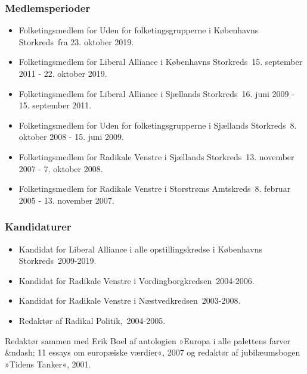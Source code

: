 \documentclass[11pt, a4paper]{awesome-cv}
\begin{document}
\begin{cvletter}
\subsubsection*{Medlemsperioder}
\begin{itemize}
\item Folketingsmedlem for Uden for folketingsgrupperne i Københavns Storkreds fra 23. oktober 2019.
\item Folketingsmedlem for Liberal Alliance i Københavns Storkreds 15. september 2011 - 22. oktober 2019.
\item Folketingsmedlem for Liberal Alliance i Sjællands Storkreds 16. juni 2009 - 15. september 2011.
\item Folketingsmedlem for Uden for folketingsgrupperne i Sjællands Storkreds 8. oktober 2008 - 15. juni 2009.
\item Folketingsmedlem for Radikale Venstre i Sjællands Storkreds 13. november 2007 - 7. oktober 2008.
\item Folketingsmedlem for Radikale Venstre i Storstrøms Amtskreds 8. februar 2005 - 13. november 2007.
\end{itemize}
\subsubsection*{Kandidaturer}
\begin{itemize}
\item Kandidat for Liberal Alliance i alle opstillingskredse i Københavns Storkreds 2009-2019.
\item Kandidat for Radikale Venstre i Vordingborgkredsen 2004-2006.
\item Kandidat for Radikale Venstre i Næstvedkredsen 2003-2008.
\end{itemize}
\begin{itemize}
\item Redaktør af Radikal Politik, 2004-2005.
\end{itemize}
Redaktør sammen med Erik Boel af antologien »Europa i alle palettens farver &ndash; 11 essays om europæiske værdier«, 2007 og redaktør af jubilæumsbogen »Tidens Tanker«, 2001.

\end{cvletter}
\end{document}
